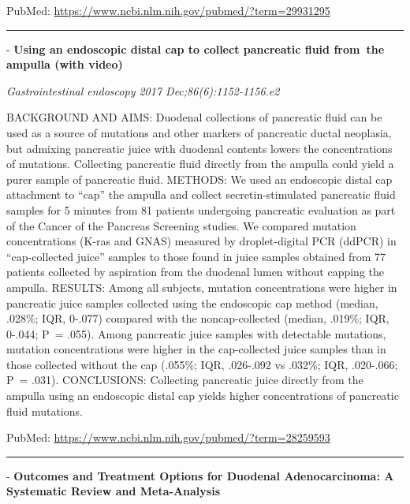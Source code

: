 \documentclass[]{article}
\begin{document}
PubMed: \url{https://www.ncbi.nlm.nih.gov/pubmed/?term=29931295}

{}

{}

\begin{center}\rule{0.5\linewidth}{\linethickness}\end{center}

 - \textbf{Using an endoscopic distal cap to collect pancreatic fluid
from~the ampulla (with video)}

\emph{Gastrointestinal endoscopy 2017 Dec;86(6):1152-1156.e2}

BACKGROUND AND AIMS: Duodenal collections of pancreatic fluid can be
used as a source of mutations and other markers of pancreatic ductal
neoplasia, but admixing pancreatic juice with duodenal contents lowers
the concentrations of mutations. Collecting pancreatic fluid directly
from the ampulla could yield a purer sample of pancreatic fluid.
METHODS: We used an endoscopic distal cap attachment to ``cap'' the
ampulla and collect secretin-stimulated pancreatic fluid samples for 5
minutes from 81 patients undergoing pancreatic evaluation as part of the
Cancer of the Pancreas Screening studies. We compared mutation
concentrations (K-ras and GNAS) measured by droplet-digital PCR (ddPCR)
in ``cap-collected juice'' samples to those found in juice samples
obtained from 77 patients collected by aspiration from the duodenal
lumen without capping the ampulla. RESULTS: Among all subjects, mutation
concentrations were higher in pancreatic juice samples collected using
the endoscopic cap method (median, .028\%; IQR, 0-.077) compared with
the noncap-collected (median, .019\%; IQR, 0-.044; P~= .055). Among
pancreatic juice samples with detectable mutations, mutation
concentrations were higher in the cap-collected juice samples than in
those collected without the cap (.055\%; IQR, .026-.092 vs .032\%; IQR,
.020-.066; P~= .031). CONCLUSIONS: Collecting pancreatic juice directly
from the ampulla using an endoscopic distal cap yields higher
concentrations of pancreatic fluid mutations.

PubMed: \url{https://www.ncbi.nlm.nih.gov/pubmed/?term=28259593}

{}

{}

\begin{center}\rule{0.5\linewidth}{\linethickness}\end{center}

 - \textbf{Outcomes and Treatment Options for Duodenal Adenocarcinoma: A
Systematic Review and Meta-Analysis}
\end{document}
